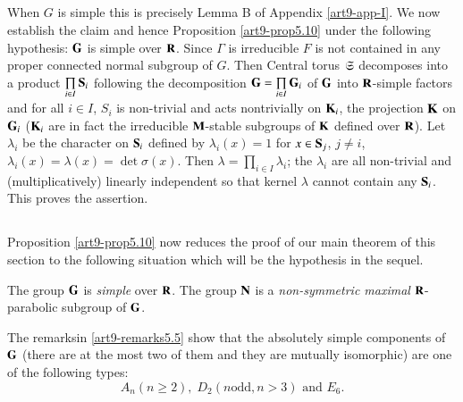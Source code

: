 \subsection{}\label{art9-subsec5.13}
When $G$ is simple this is precisely Lemma B of Appendix \ref{art9-app-I}. We now establish the claim and hence Proposition \ref{art9-prop5.10} under the following hypothesis: $\mathbf{G}$ is  simple over $\mathbf{R}$. Since $\Gamma$ is irreducible $F$ is not contained in any proper connected normal subgroup of $G$. Then Central torus $\mathfrak{S}$ decomposes into a product $\prod\limits_{i \in I} \mathbf{S}_i$ following the decomposition $\mathbf{G} = \prod\limits_{i \in I} \mathbf{G}_i$ of $\mathbf{G}$  into $\mathbf{R}$-simple factors and for all $i \in I$, $S_i$ is non-trivial and acts nontrivially on $\mathbf{K}_i$, the projection $\mathbf{K}$ on  $\mathbf{G}_i$ ($\mathbf{K}_i$ are in fact the irreducible $\mathbf{M}$-stable subgroups of $\mathbf{K}$ defined over $\mathbf{R}$). Let $\lambda_i$ be the character on $\mathbf{S}_i$ defined by $\lambda_i (x)=1$ for $x \in \mathbf{S}_j$, $j \neq i$, $\lambda_i (x) = \lambda (x) = \det \sigma (x)$. Then $\lambda = \prod\limits_{i \in I} \lambda_i$; the $\lambda_i$ are all non-trivial and (multiplicatively) linearly independent so that kernel $\lambda$ cannot contain any $\mathbf{S}_i$. This proves the assertion.


\subsection{}\label{art9-subsec5.14}
Proposition \ref{art9-prop5.10} now reduces the proof of our main theorem of this section to the following situation which will be the hypothesis in the sequel. 

The group $\mathbf{G}$ is \textit{simple} over $\mathbf{R}$. The group $\mathbf{N}$ is a \textit{non-symmetric maximal} $\mathbf{R}$-parabolic subgroup of $\mathbf{G}$.

The remarks\pageoriginale in \ref{art9-remarks5.5} show that the absolutely simple components of $\mathbf{G}$ (there are at the most two of them and they are mutually isomorphic) are one of the following types:
$$
A_n (n \geqslant 2), \; D_2 (n \text{odd}, n > 3 ) \text{ and } E_6.
$$


